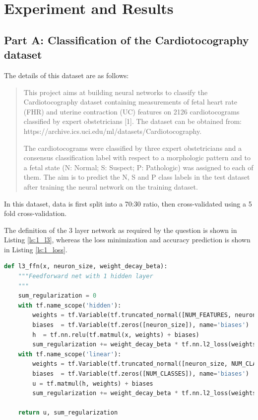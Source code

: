 \chapter{Experiment and Results}
\label{expt}
\section{Part A: Classification of the Cardiotocography dataset}
\label{part1}

The details of this dataset are as follows:
\begin{quote}
This project aims at building neural networks to classify the Cardiotocography dataset containing measurements of fetal heart rate (FHR) and uterine contraction (UC) features on 2126 cardiotocograms classified by expert obstetricians [1]. The dataset can be obtained from: https://archive.ics.uci.edu/ml/datasets/Cardiotocography.

The cardiotocograms were classified by three expert obstetricians and a consensus classification label with respect to a morphologic pattern and to a fetal state (N: Normal; S: Suspect; P: Pathologic) was assigned to each of them. The aim is to predict the N, S and P class labels in the test dataset after training the neural network on the training dataset.
\end{quote}

In this dataset, data is first split into a 70:30 ratio, then cross-validated using a 5 fold cross-validation. 

The definition of the 3 layer network as required by the question is shown in Listing \ref{ls:1_l3}, whereas the loss minimization and accuracy prediction is shown in Listing \ref{ls:1_loss}.

\begin{lstlisting}[language=Python, caption= Definition of a 3 layer network, label=ls:1_l3]
def l3_ffn(x, neuron_size, weight_decay_beta):
    """Feedforward net with 1 hidden layer
    """
    sum_regularization = 0
    with tf.name_scope('hidden'):
        weights = tf.Variable(tf.truncated_normal([NUM_FEATURES, neuron_size], stddev=1.0/math.sqrt(float(NUM_FEATURES))), name='weights')
        biases  = tf.Variable(tf.zeros([neuron_size]), name='biases')
        h  = tf.nn.relu(tf.matmul(x, weights) + biases)
        sum_regularization += weight_decay_beta * tf.nn.l2_loss(weights)
    with tf.name_scope('linear'):
        weights = tf.Variable(tf.truncated_normal([neuron_size, NUM_CLASSES], stddev=1.0/math.sqrt(float(neuron_size))), name='weights')
        biases  = tf.Variable(tf.zeros([NUM_CLASSES]), name='biases')
        u = tf.matmul(h, weights) + biases
        sum_regularization += weight_decay_beta * tf.nn.l2_loss(weights)
    
    return u, sum_regularization
\end{lstlisting}

